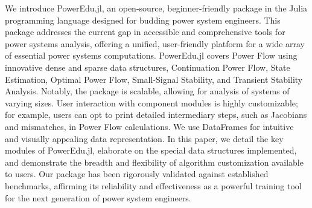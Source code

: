 \documentclass{article}
\begin{document}
    We introduce PowerEdu.jl, an open-source, beginner-friendly package in the Julia
    programming language designed for budding power system engineers. This package 
    addresses the current gap in accessible and comprehensive tools for power systems 
    analysis, offering a unified, user-friendly platform for a wide array of essential 
    power systems computations. PowerEdu.jl covers Power Flow using innovative dense 
    and sparse data structures, Continuation Power Flow, State Estimation, Optimal 
    Power Flow, Small-Signal Stability, and Transient Stability Analysis. Notably, 
    the package is scalable, allowing for analysis of systems of varying 
    sizes. User interaction with component modules is highly customizable; for example, 
    users can opt to print detailed intermediary steps, such as Jacobians and mismatches, 
    in Power Flow calculations. We use DataFrames for intuitive and visually 
    appealing data representation. In this paper, we detail the key modules of 
    PowerEdu.jl, elaborate on the special data structures implemented, and demonstrate 
    the breadth and flexibility of algorithm customization available to users. Our 
    package has been rigorously validated against established benchmarks, affirming 
    its reliability and effectiveness as a powerful training tool for the next generation 
    of power system engineers.
\end{document}

